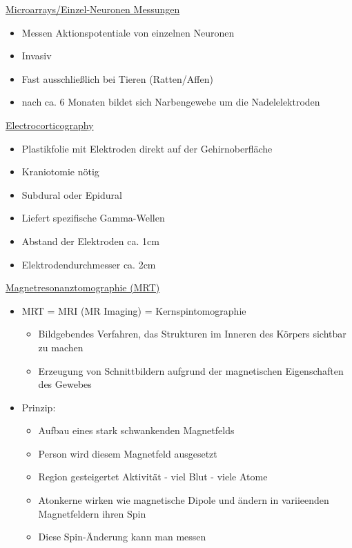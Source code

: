 \documentclass[a4paper,10pt,oneside]{article}
\begin{document}
\underline{Microarrays/Einzel-Neuronen Messungen} \\
	\begin{itemize}
		\item Messen Aktionspotentiale von einzelnen Neuronen
		\item Invasiv
		\item Fast ausschließlich bei Tieren (Ratten/Affen)
		\item nach ca. 6 Monaten bildet sich Narbengewebe um die Nadelelektroden
	\end{itemize}
	
\underline{Electrocorticography} \\
	\begin{itemize}
		\item Plastikfolie mit Elektroden direkt auf der Gehirnoberfläche
		\item Kraniotomie nötig
		\item Subdural oder Epidural
		\item Liefert spezifische Gamma-Wellen
		\item Abstand der Elektroden ca. 1cm
		\item Elektrodendurchmesser ca. 2cm
	\end{itemize}
	
\underline{Magnetresonanztomographie (MRT)} \\
	\begin{itemize}
		\item MRT = MRI (MR Imaging) = Kernspintomographie 
			\begin{itemize}
				\item Bildgebendes Verfahren, das Strukturen im Inneren des Körpers sichtbar zu machen
				\item Erzeugung von Schnittbildern aufgrund der magnetischen Eigenschaften des Gewebes 
			\end{itemize}
		\item Prinzip:
			\begin{itemize}
				\item Aufbau eines stark schwankenden Magnetfelds
				\item Person wird diesem Magnetfeld ausgesetzt
				\item Region gesteigertet Aktivität - viel Blut - viele Atome
				\item Atonkerne wirken wie magnetische Dipole und ändern in variieenden Magnetfeldern ihren Spin
				\item Diese Spin-Änderung kann man messen
			\end{itemize}
	\end{itemize}
	
\end{document}
